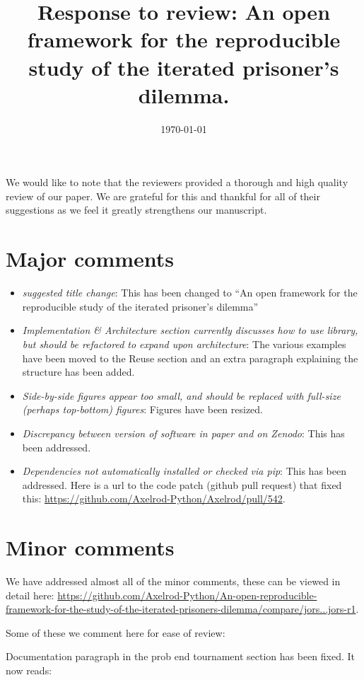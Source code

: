 \documentclass{article}
\title{Response to review: An open framework for the reproducible study of the
iterated prisoner's dilemma.}
\date{\today}
\begin{document}
\maketitle

We would like to note that the reviewers provided a thorough and high quality
review of our paper. We are grateful for this and thankful for all of their
suggestions as we feel it greatly strengthens our manuscript.

\section{Major comments}


\begin{itemize}
\item \textit{suggested title change}: This has been changed to ``An open
    framework for the reproducible study of the iterated prisoner's dilemma''
\item \textit{Implementation \& Architecture section currently discusses how to
    use library, but should be refactored to expand upon architecture}: The
    various examples have been moved to the Reuse section and an extra paragraph
    explaining the structure has been added.
\item \textit{Side-by-side figures appear too small, and should be replaced with
    full-size (perhaps top-bottom) figures}: Figures have been resized.
\item \textit{Discrepancy between version of software in paper and on Zenodo}:
    This has been addressed.
\item \textit{Dependencies not automatically installed or checked via pip}: This
    has been addressed. Here is a url to the code patch (github pull request)
    that fixed this: \url{https://github.com/Axelrod-Python/Axelrod/pull/542}.
\end{itemize}

\section{Minor comments}

We have addressed almost all of the minor comments, these can be viewed in
detail here:
\url{https://github.com/Axelrod-Python/An-open-reproducible-framework-for-the-study-of-the-iterated-prisoners-dilemma/compare/jors...jors-r1}.

Some of these we comment here for ease of review:

Documentation paragraph in the prob end tournament section has been fixed. It
now reads:
\end{document}

